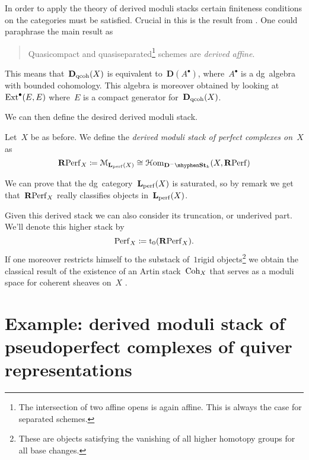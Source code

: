 \begin{refsection}
In order to apply the theory of derived moduli stacks certain finiteness conditions on the categories must be satisfied. Crucial in this is the result from \cite{bondal-vandenbergh}. One could paraphrase the main result as
\begin{quote}
  Quasicompact and quasiseparated\footnote{The intersection of two affine opens is again affine. This is always the case for separated schemes.} schemes are \emph{derived affine}.
\end{quote}
\begin{flushright}
  \cite[corollary 3.1.8]{bondal-vandenbergh}
\end{flushright}
This means that~$\mathbf{D}_{\mathrm{qcoh}}(X)$ is equivalent to~$\mathbf{D}(A^\bullet)$, where~$A^\bullet$ is a dg~algebra with bounded cohomology. This algebra is moreover obtained by looking at~$\mathrm{Ext}^\bullet(E,E)$ where~$E$ is a compact generator for~$\mathbf{D}_{\mathrm{qcoh}}(X)$.

We can then define the desired derived moduli stack.
\begin{definition}
  Let~$X$ be as before. We define the \emph{derived moduli stack of perfect complexes on~$X$} as
  \begin{equation}
    \RPerf_X\coloneqq\mathcal{M}_{\LLL_\perf(X)}\cong\HHom_{\mathbf{D}^-\mhyphen\St_k}(X,\RPerf)
  \end{equation}
\end{definition}

\begin{remark}
  We can prove that the dg~category~$\mathbf{L}_{\mathrm{perf}}(X)$ is saturated, so by remark  we get that~$\mathbf{R}\mathrm{Perf}_X$ really classifies objects in~$\mathbf{L}_{\mathrm{perf}}(X)$.
\end{remark}

\begin{remark}
  Given this derived stack we can also consider its truncation, or underived part. We'll denote this higher stack by
  \begin{equation}
    \mathrm{Perf}_X\coloneqq\mathrm{t}_0(\mathbf{R}\mathrm{Perf}_X).
  \end{equation}
  If one moreover restricts himself to the substack of~$1$\dash rigid objects\footnote{These are objects satisfying the vanishing of all higher homotopy groups for all base changes.} we obtain the classical result of the existence of an Artin stack~$\mathrm{Coh}_X$ that serves as a moduli space for coherent sheaves on~$X$ \cite[th\'eor\`eme 4.6.2.1]{laumon-moret-bailly} \cite[tag 08CW]{stacks}.
\end{remark}


\section{Example: derived moduli stack of pseudoperfect complexes of quiver representations}
\label{section:example-2}

\printbibliography[heading = local]

\end{refsection}
